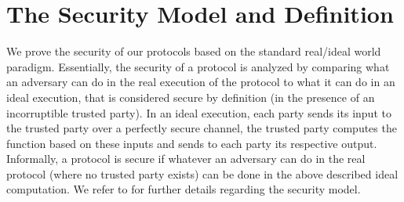 \section{The  Security Model and Definition}\label{sec:security model}
We prove the security of our protocols based on the standard real/ideal world paradigm.  Essentially, the security of a protocol is analyzed by comparing what an adversary can do in the real execution of the protocol to what it can do in an ideal execution,  that is considered secure by definition (in the presence of an incorruptible trusted party). In an ideal execution, each party sends its input to the trusted party over a perfectly secure channel, the trusted party computes the function based on these inputs and sends to each party its respective output.  Informally, a protocol
is secure if whatever an adversary can do in the real protocol (where no trusted party exists) can be done in the above described ideal computation. We refer to \cite{Canetti00,Goldreich2001,Lindell17,CohenL14} for further details regarding the security model.  


